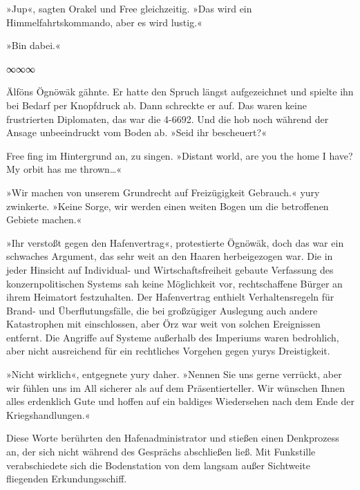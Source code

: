 »Jup«, sagten Orakel und Free gleichzeitig. »Das wird ein Himmelfahrtskommando, aber es wird lustig.«

»Bin dabei.«

\begin{center}
∞∞∞
\end{center}

 Älföns Ögnöwäk gähnte. Er hatte den Spruch längst aufgezeichnet und spielte ihn bei Bedarf per Knopfdruck ab.  Dann schreckte er auf. Das waren keine frustrierten Diplomaten, das war die 4-6692. Und die hob noch während der Ansage unbeeindruckt vom Boden ab. »Seid ihr bescheuert?«

Free fing im Hintergrund an, zu singen. »Distant world, are you the home I have? My orbit has me thrown…«

»Wir machen von unserem Grundrecht auf Freizügigkeit Gebrauch.« yury zwinkerte. »Keine Sorge, wir werden einen weiten Bogen um die betroffenen Gebiete machen.«

»Ihr verstoßt gegen den Hafenvertrag«, protestierte Ögnöwäk, doch das war ein schwaches Argument, das sehr weit an den Haaren herbeigezogen war. Die in jeder Hinsicht auf Individual- und Wirtschaftsfreiheit gebaute Verfassung des konzernpolitischen Systems sah keine Möglichkeit vor, rechtschaffene Bürger an ihrem Heimatort festzuhalten. Der Hafenvertrag enthielt Verhaltensregeln für Brand- und Überflutungsfälle, die bei großzügiger Auslegung auch andere Katastrophen mit einschlossen, aber Örz war weit von solchen Ereignissen entfernt. Die Angriffe auf Systeme außerhalb des Imperiums waren bedrohlich, aber nicht ausreichend für ein rechtliches Vorgehen gegen yurys Dreistigkeit.

»Nicht wirklich«, entgegnete yury daher. »Nennen Sie uns gerne verrückt, aber wir fühlen uns im All sicherer als auf dem Präsentierteller. Wir wünschen Ihnen alles erdenklich Gute und hoffen auf ein baldiges Wiedersehen nach dem Ende der Kriegshandlungen.«

Diese Worte berührten den Hafenadministrator und stießen einen Denkprozess an, der sich nicht während des Gesprächs abschließen ließ. Mit Funkstille verabschiedete sich die Bodenstation von dem langsam außer Sichtweite fliegenden Erkundungsschiff.

